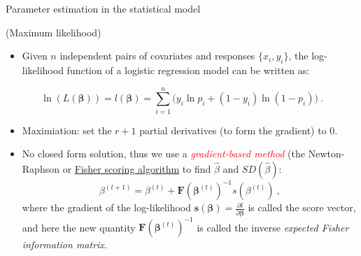 \documentclass[10pt,ignorenonframetext,]{beamer}
\providecommand{\tightlist}{%
  \setlength{\itemsep}{0pt}\setlength{\parskip}{0pt}}
\begin{document}
\begin{frame}

\begin{block}{Parameter estimation in the statistical model}

(Maximum likelihood) \vspace{2mm}

\begin{itemize}
\tightlist
\item
  Given \(n\) independent pairs of covariates and responses
  \(\{x_i, y_i\}\), the log-likelihood function of a logistic regression
  model can be written as: \vspace{-2mm}
\end{itemize}

\[ \ln(L(\boldsymbol{\beta}))=l(\boldsymbol{\beta}) =\sum_{i=1}^n \Big ( y_i \ln p_i + (1-y_i) \ln(1 - p_i )\Big ) \ .\]

\begin{itemize}
\tightlist
\item
  Maximiation: set the \(r+1\) partial derivatives (to form the
  gradient) to 0.
\end{itemize}

\small

\begin{itemize}
\tightlist
\item
  No closed form solution, thus we use a
  \emph{\textcolor{red}{gradient-based method}} (the Newton-Raphson or
  \href{https://en.wikipedia.org/wiki/Scoring_algorithm}{Fisher scoring
  algorithm} to find \(\hat\beta\) and \(SD(\hat\beta)\): \[
  \beta^{(t+1)}=\beta^{(t)} + {\boldsymbol F}({\boldsymbol \beta}^{(t)})^{-1} s(\beta^{(t)}) \ ,
  \] where the gradient of the log-likelihood
  \({\boldsymbol s}({\boldsymbol \beta})=\frac{\partial l}{\partial \boldsymbol \beta}\)
  is called the score vector, and here the new quantity
  \({\boldsymbol F}({\boldsymbol \beta}^{(t)})^{-1}\) is called the
  inverse \emph{expected Fisher information matrix}.
\end{itemize}

\end{block}

\end{frame}
\end{document}
